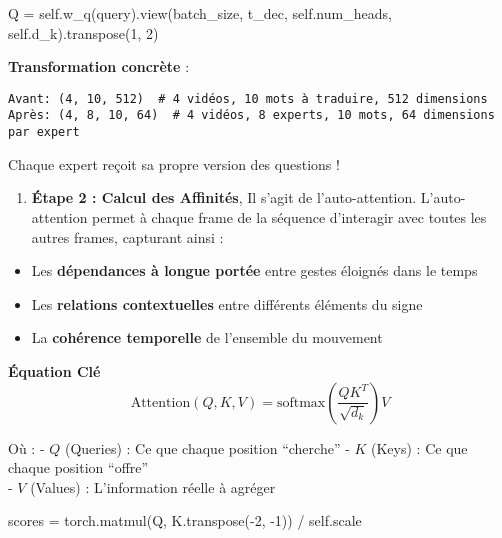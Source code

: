 \documentclass[12pt]{article}
\providecommand{\tightlist}{%
      \setlength{\itemsep}{0pt}\setlength{\parskip}{0pt}}
\newenvironment{Shaded}{}{}
\newcommand{\DecValTok}[1]{\textcolor[rgb]{0.25,0.63,0.44}{{#1}}}
\newcommand{\NormalTok}[1]{{#1}}
\newcommand{\VariableTok}[1]{\textcolor[rgb]{0.10,0.09,0.49}{{#1}}}
\newcommand{\OperatorTok}[1]{\textcolor[rgb]{0.40,0.40,0.40}{{#1}}}
\begin{document}
\begin{Shaded}
\begin{Highlighting}[]
\NormalTok{Q }\OperatorTok{=} \VariableTok{self}\NormalTok{.w\_q(query).view(batch\_size, t\_dec, }\VariableTok{self}\NormalTok{.num\_heads, }\VariableTok{self}\NormalTok{.d\_k).transpose(}\DecValTok{1}\NormalTok{, }\DecValTok{2}\NormalTok{)}
\end{Highlighting}
\end{Shaded}

\textbf{Transformation concrète} :

\begin{verbatim}
Avant: (4, 10, 512)  # 4 vidéos, 10 mots à traduire, 512 dimensions
Après: (4, 8, 10, 64)  # 4 vidéos, 8 experts, 10 mots, 64 dimensions par expert
\end{verbatim}

Chaque expert reçoit sa propre version des questions !

\begin{enumerate}
\def\labelenumi{\arabic{enumi}.}
\setcounter{enumi}{1}
\tightlist
\item
  \textbf{Étape 2 : Calcul des Affinités}, Il s'agit de
  l'auto-attention. L'auto-attention permet à chaque frame de la
  séquence d'interagir avec toutes les autres frames, capturant ainsi :
\end{enumerate}

\begin{itemize}
\tightlist
\item
  Les \textbf{dépendances à longue portée} entre gestes éloignés dans le
  temps
\item
  Les \textbf{relations contextuelles} entre différents éléments du
  signe
\item
  La \textbf{cohérence temporelle} de l'ensemble du mouvement
\end{itemize}

\textbf{Équation Clé}
\[\text{Attention}(Q, K, V) = \text{softmax}\left(\frac{QK^T}{\sqrt{d_k}}\right)V\]

Où : - \(Q\) (Queries) : Ce que chaque position ``cherche'' - \(K\)
(Keys) : Ce que chaque position ``offre''\\
- \(V\) (Values) : L'information réelle à agréger

\begin{Shaded}
\begin{Highlighting}[]
\NormalTok{scores }\OperatorTok{=}\NormalTok{ torch.matmul(Q, K.transpose(}\OperatorTok{{-}}\DecValTok{2}\NormalTok{, }\OperatorTok{{-}}\DecValTok{1}\NormalTok{)) }\OperatorTok{/} \VariableTok{self}\NormalTok{.scale}
\end{Highlighting}
\end{Shaded}
\end{document}
